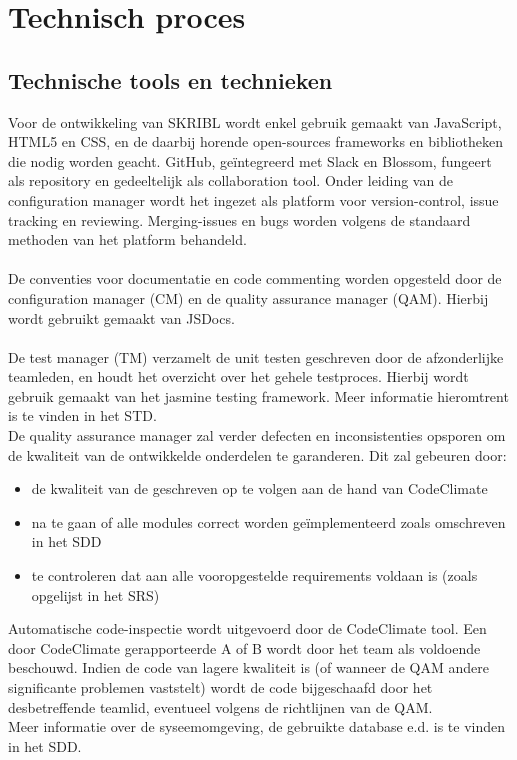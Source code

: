 \documentclass{article}
\begin{document}
 
  \clearpage
 
 

\section{Technisch proces}

\subsection{Technische tools en technieken}

Voor de ontwikkeling van SKRIBL wordt enkel gebruik gemaakt van JavaScript, HTML5 en CSS, en de daarbij horende open-sources frameworks en bibliotheken die nodig worden geacht. GitHub, ge\"{i}ntegreerd met Slack en Blossom, fungeert als repository en gedeeltelijk als collaboration tool. Onder leiding van de configuration manager wordt het ingezet als platform voor version-control, issue tracking en reviewing. Merging-issues en bugs worden volgens de standaard methoden van het platform behandeld. \\
\\
De conventies voor documentatie en code commenting worden opgesteld door de configuration manager (CM) en de quality assurance manager (QAM). Hierbij wordt gebruikt gemaakt van JSDocs. \\
\\
De test manager (TM) verzamelt de unit testen geschreven door de afzonderlijke teamleden, en houdt het overzicht over het gehele testproces. Hierbij wordt gebruik gemaakt van het jasmine testing framework. Meer informatie hieromtrent is te vinden in het STD.
\\
De quality assurance manager zal verder defecten en inconsistenties opsporen om de kwaliteit van de ontwikkelde onderdelen te garanderen. Dit zal gebeuren door:
\begin{itemize}
\item de kwaliteit van de geschreven op te volgen aan de hand van CodeClimate
\item na te gaan of alle modules correct worden ge\"{i}mplementeerd zoals omschreven in het SDD
\item te controleren dat aan alle vooropgestelde requirements voldaan is (zoals opgelijst in het SRS)
\end{itemize}
Automatische code-inspectie wordt uitgevoerd door de CodeClimate tool. Een door CodeClimate gerapporteerde  A of B wordt door het team als voldoende beschouwd. Indien de code van lagere kwaliteit is (of wanneer de QAM andere significante problemen vaststelt) wordt de code bijgeschaafd door het desbetreffende teamlid, eventueel volgens de richtlijnen van de QAM.
\\
Meer informatie over de syseemomgeving, de gebruikte database e.d. is te vinden in het SDD.
\end{document}
